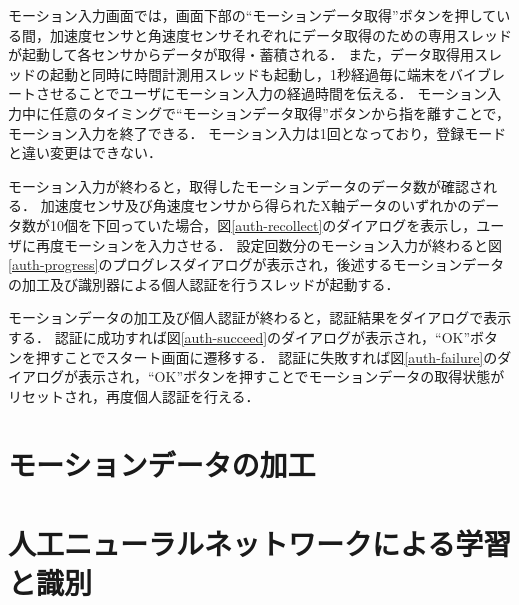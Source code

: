 モーション入力画面では，画面下部の``モーションデータ取得''ボタンを押している間，加速度センサと角速度センサそれぞれにデータ取得のための専用スレッドが起動して各センサからデータが取得・蓄積される．
また，データ取得用スレッドの起動と同時に時間計測用スレッドも起動し，1秒経過毎に端末をバイブレートさせることでユーザにモーション入力の経過時間を伝える．
モーション入力中に任意のタイミングで``モーションデータ取得''ボタンから指を離すことで，モーション入力を終了できる．
モーション入力は1回となっており，登録モードと違い変更はできない．

モーション入力が終わると，取得したモーションデータのデータ数が確認される．
加速度センサ及び角速度センサから得られたX軸データのいずれかのデータ数が10個を下回っていた場合，図\ref{auth-recollect}のダイアログを表示し，ユーザに再度モーションを入力させる．
設定回数分のモーション入力が終わると図\ref{auth-progress}のプログレスダイアログが表示され，後述するモーションデータの加工及び識別器による個人認証を行うスレッドが起動する．

モーションデータの加工及び個人認証が終わると，認証結果をダイアログで表示する．
認証に成功すれば図\ref{auth-succeed}のダイアログが表示され，``OK''ボタンを押すことでスタート画面に遷移する．
認証に失敗すれば図\ref{auth-failure}のダイアログが表示され，``OK''ボタンを押すことでモーションデータの取得状態がリセットされ，再度個人認証を行える．

\section{モーションデータの加工}

\section{人工ニューラルネットワークによる学習と識別}
